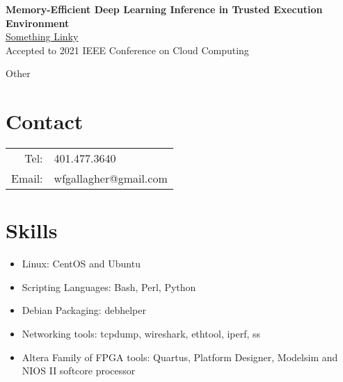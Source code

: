 \documentclass[10pt,a4paper]{article}
\begin{document}
{\begin{tcolorbox}
  \tcblower

  \textbf{Memory-Efficient Deep Learning Inference in Trusted Execution Environment} \\
  \href{http://arxiv-export-lb.library.cornell.edu/abs/2104.15109?context=cs.LG}{Something Linky} \\
  Accepted to 2021 IEEE Conference on Cloud Computing \\
\end{tcolorbox}


\begin{tcolorbox}

  {\selectfont
    \begin{center}
      \LARGE{Other}
    \end{center}
  }

  \tcblower

  \section*{Contact}
  \begin{tabular}{r l}
    Tel: & 401.477.3640 \\
    Email: & wfgallagher@gmail.com \\
  \end{tabular}

  \section*{Skills}
  \begin{itemize}[noitemsep]
    \item{Linux: CentOS and Ubuntu}
    \item{Scripting Languages: Bash, Perl, Python}
    \item{Debian Packaging: debhelper}
    \item{Networking tools: tcpdump, wireshark, ethtool, iperf, ss}
    \item{Altera Family of FPGA tools: Quartus, Platform Designer, Modelsim and NIOS II softcore processor}
  \end{itemize}

\end{tcolorbox}

}
\end{document}

